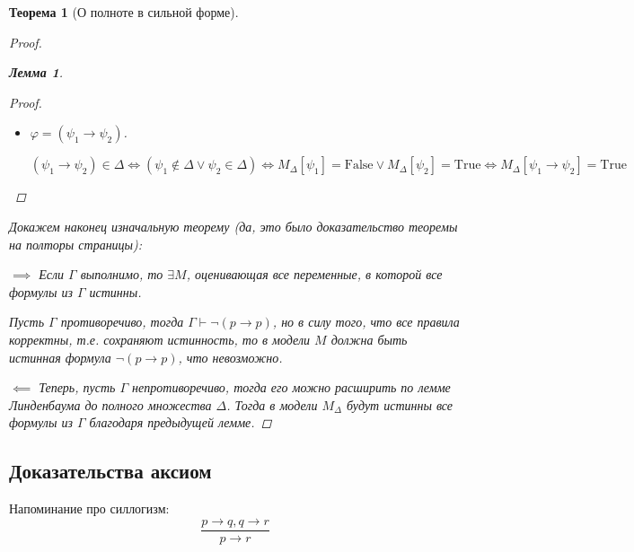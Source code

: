 \documentclass[12pt]{article}
\let\im\rightarrow
\let\n\neg
\let\nin\notin
\theoremstyle{definition}
\theoremstyle{plain}
\newtheorem{theorem}{Теорема}[section]
\newtheorem{lemma}{Лемма}[section]
\theoremstyle{remark}
\begin{document}
\begin{theorem}[О полноте в сильной форме]
\begin{proof}
\begin{lemma}
\begin{proof}
\begin{itemize}
            $M_\Delta[\varphi] =
            \begin{cases}
              \mathrm{True},\ M_\Delta[\psi] = \mathrm{False} \iff \psi
              \nin \Delta \iff \varphi = \n \psi \in \Delta\\
              \mathrm{False},\ M_\Delta[\psi] = \mathrm{True} \iff \psi
              \in \Delta \iff \varphi = \n \psi \nin \Delta
            \end{cases}$ из предыдущей леммы.

          \item $\varphi = (\psi_1 \im \psi_2)$.

            $(\psi_1 \im \psi_2) \in \Delta \iff (\psi_1 \nin \Delta \lor
            \psi_2 \in \Delta) \iff M_\Delta[\psi_1] = \mathrm{False} \lor
            M_\Delta[\psi_2] = \mathrm{True} \iff M_\Delta[\psi_1 \im
            \psi_2] = \mathrm{True}$
        \end{itemize}
      \end{proof}
    \end{lemma}

    Докажем наконец изначальную теорему (да, это было доказательство
    теоремы на полторы страницы):

    $\implies$ Если $\Gamma$ выполнимо, то $\exists M$, оценивающая все
    переменные, в которой все формулы из $\Gamma$ истинны.

    Пусть $\Gamma$ противоречиво, тогда $\Gamma \vdash \n (p \im p)$,
    но в силу того, что все правила корректны, т.е. сохраняют
    истинность, то в модели $M$ должна быть истинная формула $\n(p \im
    p)$, что невозможно.

    $\impliedby$ Теперь, пусть $\Gamma$ непротиворечиво, тогда его
    можно расширить по лемме Линденбаума до полного множества $\Delta$.
    Тогда в модели $M_\Delta$ будут истинны все формулы из $\Gamma$
    благодаря предыдущей лемме.
  \end{proof}
\end{theorem}

\subsection{Доказательства аксиом}

Напоминание про силлогизм:
\[
  \frac{p \im q, q \im r}{p \im r}
\]
\end{document}
